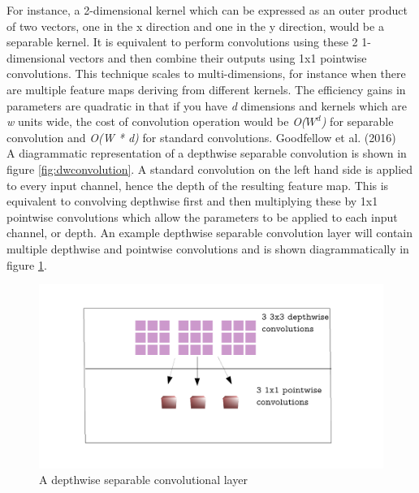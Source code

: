 \documentclass{article}
\begin{document}
For instance, a 2-dimensional kernel which can be expressed as an outer product of two vectors, one in the x direction and one in the y direction, would be a separable kernel. It is equivalent to perform convolutions using these 2 1-dimensional vectors and then combine their outputs using 1x1 pointwise convolutions. This technique scales to multi-dimensions, for instance when there are multiple feature maps deriving from different kernels. The efficiency gains in parameters are quadratic in that if you have \emph{d} dimensions and kernels which are \emph{w} units wide, the cost of convolution operation would be \emph{O($W^d$)} for separable convolution and \emph{O(W * d)} for standard convolutions. Goodfellow et al. (2016) \\

A diagrammatic representation of a depthwise separable convolution is shown in figure \ref{fig:dwconvolution}. A standard convolution on the left hand side is applied to every input channel, hence the depth of the resulting feature map. This is equivalent to convolving depthwise first and then multiplying these by 1x1 pointwise convolutions which allow the parameters to be applied to each input channel, or depth. An example depthwise separable convolution layer will contain multiple depthwise and pointwise convolutions and is shown diagrammatically in figure \ref{fig:dwconvolutionlayer}.\\

\begin{figure}[h]
  \includegraphics[width=\linewidth]{dwlayer.pdf}
  \caption{A depthwise separable convolutional layer}
  \label{fig:dwconvolutionlayer}
\end{figure}
\end{document}
